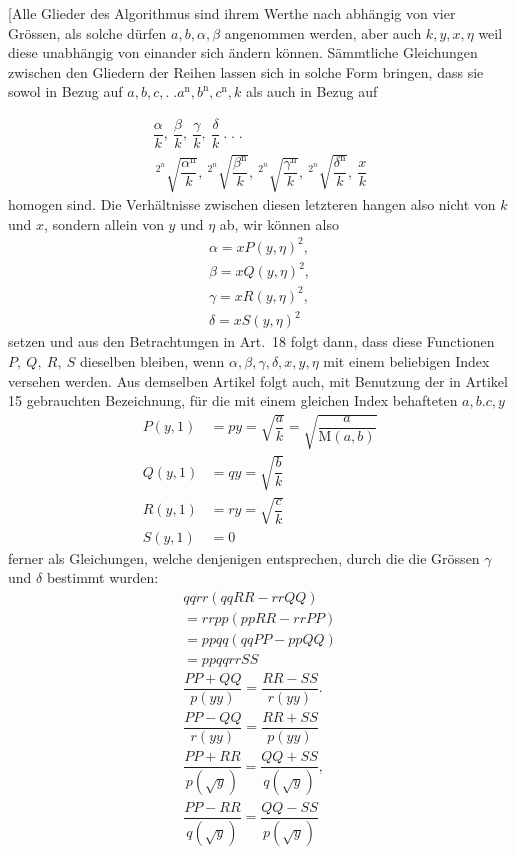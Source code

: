 [Alle Glieder des Algorithmus sind ihrem Werthe nach abhängig von vier Grössen, als solche dürfen $a,\allowbreak b,\allowbreak \alpha,\allowbreak \beta$ angenommen werden, aber auch $k,\allowbreak y,\allowbreak x,\allowbreak \eta$ weil diese unabhängig von einander sich ändern können. Sämmtliche Gleichungen zwischen den Gliedern der Reihen lassen sich in solche Form bringen, dass sie sowol in Bezug auf $a,\allowbreak b,\allowbreak c,\allowbreak .\;. a^{\mathrm n},\allowbreak b^{\mathrm n},\allowbreak c^{\mathrm n},\allowbreak k$ als auch in Bezug auf



\[
\begin{gathered}\dfrac{\alpha}{k},\ \dfrac{\beta}{k},\ \dfrac{\gamma}{k},\ \dfrac{\delta}{k}\ .\;.\;.\\[8pt]\
{}^{2^n}\!\surd {\dfrac{\alpha^{\mathrm n}}{k}},\
{}^{2^n}\!\surd {\dfrac{\beta^{\mathrm n}}{k}},\
{}^{2^n}\!\surd {\dfrac{\gamma^{\mathrm n}}{k}},\
{}^{2^n}\!\surd {\dfrac{\delta^{\mathrm n}}{k}},\ \dfrac{x}{k}\end{gathered}
\]
homogen sind. Die Verhältnisse zwischen diesen letzteren hangen also nicht von $k$ und $x$, sondern allein von $y$ und $\eta$ ab, wir können also
\[
\begin{gathered}\alpha=x P(y,\eta)^2,\\[5pt]
\beta=x Q(y,\eta)^2,\\[5pt]
\gamma=x R(y,\eta)^2,\\[5pt]
\delta=x S(y,\eta)^2\end{gathered}
\]
setzen und aus den Betrachtungen in Art.\ 18 folgt dann, dass diese Functionen $P,\allowbreak \ Q,\allowbreak \ R,\allowbreak \ S$ dieselben bleiben, wenn $\alpha,\allowbreak \beta,\allowbreak \gamma,\allowbreak \delta,\allowbreak x,\allowbreak y,\allowbreak \eta$ mit einem beliebigen Index versehen werden. Aus demselben Artikel folgt auch, mit Benutzung der in Artikel 15 gebrauchten Bezeichnung, für die mit einem gleichen Index behafteten $a,\allowbreak b. c,\allowbreak y$
\[
\begin{aligned}
P(y,1)&=py=\surd {\dfrac ak}=\surd {\dfrac a{\mathrm M(a,b)}}\\
Q(y,1)&=qy=\surd {\dfrac bk}\\
R(y,1)&=ry=\surd {\dfrac ck}\\
S(y,1)&=0
\end{aligned}
\]
ferner als Gleichungen, welche denjenigen entsprechen, durch die die Grössen $\gamma$ und $\delta$ bestimmt wurden:
\[
\begin{gathered}
qqrr(qqRR-rrQQ)\\[4pt]=rrpp(ppRR-rrPP)\\
=ppqq(qqPP-ppQQ)\\[4pt]=ppqqrrSS\\[4pt]
\dfrac{PP+QQ}{p(yy)}=\dfrac{RR-SS}{r(yy)}.\\[9pt]
\dfrac{PP-QQ}{r(yy)}=\dfrac{RR+SS}{p(yy)}\\[4pt]
\dfrac{PP+RR}{p(\surd  y)}=\dfrac{QQ+SS}{q(\surd  y)},\\[9pt]
\dfrac{PP-RR}{q(\surd  y)}=\dfrac{QQ-SS}{p(\surd  y)}
\end{gathered}
\]
